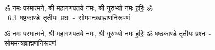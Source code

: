 \documentclass[17pt]{extarticle}
\begin{document}
\begin{titlepage}
    \begin{center}
 
\begin{sanskrit}
    { \Large
    ॐ नमः परमात्मने, श्री महागणपतये नमः, श्री गुरुभ्यो नमः
ह॒रिः॒ ॐ 
    }
    \\
    \vspace{2.5cm}
    \mbox{ \Huge
    6.3      षष्ठकाण्डे तृतीयः प्रश्नः - सोममन्त्रब्राह्मणनिरूपणं   }
\end{sanskrit}
\end{center}

\end{titlepage}
\tableofcontents

ॐ नमः परमात्मने, श्री महागणपतये नमः, श्री गुरुभ्यो नमः
ह॒रिः॒ ॐ       षष्ठकाण्डे तृतीयः प्रश्नः - सोममन्त्रब्राह्मणनिरूपणं \newline

\end{document}
